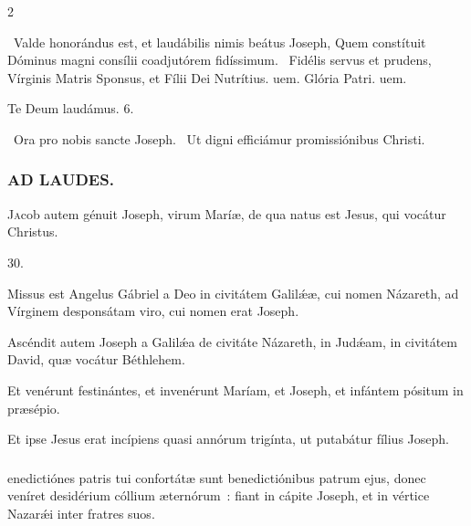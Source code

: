\documentclass[9pt,twoside]{extarticle}
\begin{document}
\begin{multicols}{2}
{\begin{tightlist}{}
\item {}~Valde honorándus est, et laudábilis nimis beátus Joseph, \textred{*} Quem constítuit Dóminus magni consílii coadjutórem fidíssimum. ~Fidélis servus et prudens, Vírginis Matris Sponsus, et Fílii Dei Nutrítius. uem. Glória Patri. uem.
\item Te Deum laudámus. 6.
\item {}~Ora pro nobis sancte Joseph. ~Ut digni efficiámur promissiónibus Christi.
\end{tightlist}

\subsubsection*{\center \textsc{AD LAUDES.}}
\begin{center}\end{center}
\lettrine{J}acob autem génuit Joseph, virum Maríæ, de qua natus est Jesus, qui vocátur Christus.

\begin{tightlist}{}
\item {} 30.
\item {} Missus est Angelus Gábriel a Deo in civitátem Galilǽæ, cui nomen Názareth, ad Vírginem desponsátam viro, cui nomen erat Joseph.
\item {} Ascéndit autem Joseph a Galilǽa de civitáte Názareth, in Judǽam, in civitátem David, quæ vocátur Béthlehem.
\item {} Et venérunt festinántes, et invenérunt Maríam, et Joseph, et infántem pósitum in præsépio.
\item {} Et ipse Jesus erat incípiens quasi annórum trigínta, ut putabátur fílius Joseph.
\end{tightlist}

\subsubsection*{}
enedictiónes patris tui confortátæ sunt benedictiónibus patrum ejus, donec veníret desidérium cóllium æternórum~: fiant in cápite Joseph, et in vértice Nazarǽi inter fratres suos.

}
\end{multicols}
\end{document}
